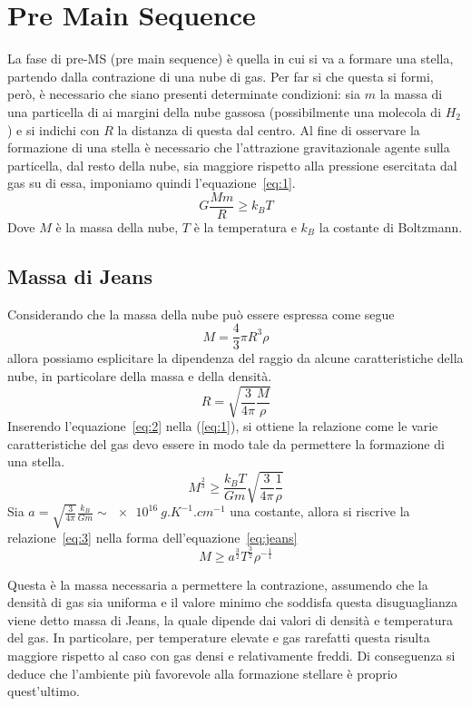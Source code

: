 \section{Pre Main Sequence}\label{sec:pre-main-sequence}

La fase di pre-MS (pre main sequence) è quella in cui si va a formare una stella, partendo dalla contrazione di una nube di gas. Per far si che questa si formi, però, è necessario che siano presenti determinate condizioni: sia $m$ la massa di una particella di ai margini della nube gassosa (possibilmente una molecola di $H_2$) e si indichi con $R$ la distanza di questa dal centro. Al fine di osservare la formazione di una stella è necessario che l'attrazione gravitazionale agente sulla particella, dal resto della nube, sia maggiore rispetto alla pressione esercitata dal gas su di essa, imponiamo quindi l'equazione~\ref{eq:1}.
\begin{equation}
    G \frac{M m}{R} \geq k_B T
    \label{eq:1}
\end{equation}
Dove $M$ è la massa della nube, $T$ è la temperatura e $k_B$ la costante di Boltzmann.
\subsection{Massa di Jeans}

Considerando che la massa della nube può essere espressa come segue
\[
    M = \frac{4}{3} \pi R^3 \rho
\]
allora possiamo esplicitare la dipendenza del raggio da alcune caratteristiche della nube, in particolare della massa e della densità.
\begin{equation}
    R = \sqrt{\frac{3}{4\pi} \frac{M}{\rho}}
    \label{eq:2}
\end{equation}
Inserendo l'equazione~\ref{eq:2} nella (\ref{eq:1}), si ottiene la relazione come le varie caratteristiche del gas devo essere in modo tale da permettere la formazione di una stella.
\begin{equation}
    M^{\frac{2}{3}} \geq \frac{k_B T}{G m} \sqrt{\frac{3}{4\pi} \frac{1}{\rho}}
    \label{eq:3}
\end{equation}
Sia $a = \sqrt{\frac{3}{4\pi}}\frac{k_B}{G m} \sim \SI{e16}{g.K^{-1}.cm^{-1}}$ una costante, allora si riscrive la relazione~\ref{eq:3} nella forma dell'equazione~\ref{eq:jeans}
\begin{equation}
    M \geq a^{\frac{3}{2}} T^{\frac{3}{2}} \rho^{-\frac{1}{1}}
\label{eq:jeans}
\end{equation}

Questa è la massa necessaria a permettere la contrazione, assumendo che la densità di gas sia uniforma e il valore minimo che soddisfa questa disuguaglianza viene detto massa di Jeans, la quale dipende dai valori di densità e temperatura del gas. In particolare, per temperature elevate e gas rarefatti questa risulta maggiore rispetto al caso con gas densi e relativamente freddi. Di conseguenza si deduce che l'ambiente più favorevole alla formazione stellare è proprio quest'ultimo.

